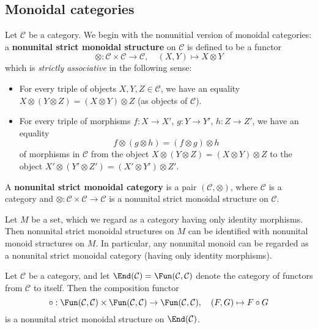 \subsection{Monoidal categories}
Let $\mathcal{C}$ be a category. We begin with the nonunitial version of monoidal categories: a \textbf{nonunital strict monoidal structure} on $\mathcal{C}$ is defined to be a functor
\[\otimes:\mathcal{C}\times\mathcal{C}\to\mathcal{C},\quad (X,Y)\mapsto X\otimes Y\]
which is \textit{strictly associative} in the following sense:
\begin{itemize}
\item For every triple of objects $X,Y,Z\in\mathcal{C}$, we have an equality $X\otimes(Y\otimes Z)=(X\otimes Y)\otimes Z$ (as objects of $\mathcal{C}$).
\item For every triple of morphisms $f:X\to X'$, $g:Y\to Y'$, $h:Z\to Z'$, we have an equality
\[f\otimes(g\otimes h)=(f\otimes g)\otimes h\]
of morphisms in $\mathcal{C}$ from the object $X\otimes(Y\otimes Z)=(X\otimes Y)\otimes Z$ to the object $X'\otimes(Y'\otimes Z')=(X'\otimes Y')\otimes Z'$.
\end{itemize}
A \textbf{nonunital strict monoidal category} is a pair $(\mathcal{C},\otimes)$, where $\mathcal{C}$ is a category and $\otimes:\mathcal{C}\times\mathcal{C}\to\mathcal{C}$ is a nonunital strict monoidal structure on $\mathcal{C}$.
\begin{example}
Let $M$ be a set, which we regard as a category having only identity morphisms. Then nonunital strict monoidal structures on $M$ can be identified with nonunital monoid structures on $M$. In particular, any nonunital monoid can be regarded as a nonunital strict monoidal category (having only identity morphisms).
\end{example}
\begin{example}\label{monoidal cat on End of cat}
Let $\mathcal{C}$ be a category, and let $\End(\mathcal{C})=\Fun(\mathcal{C},\mathcal{C})$ denote the category of functors from $\mathcal{C}$ to itself. Then the composition functor
\[\circ:\Fun(\mathcal{C},\mathcal{C})\times\Fun(\mathcal{C},\mathcal{C})\to\Fun(\mathcal{C},\mathcal{C}),\quad (F,G)\mapsto F\circ G\]
is a nonunital strict monoidal structure on $\End(\mathcal{C})$.
\end{example}
